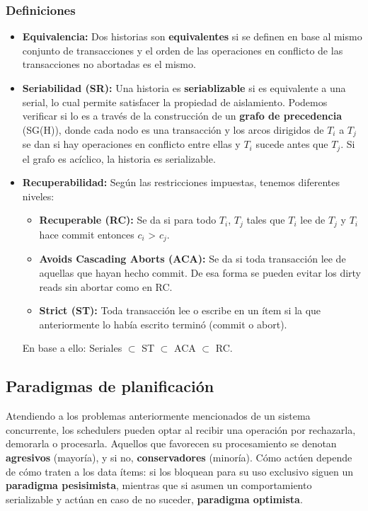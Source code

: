 \subsubsection*{Definiciones}
\begin{itemize}
    \item \textbf{Equivalencia:} Dos historias son \textbf{equivalentes} si se definen en base al mismo conjunto de transacciones y el orden de las operaciones en conflicto de las transacciones no abortadas es el mismo.
    \item \textbf{Seriabilidad (SR):} Una historia es \textbf{seriablizable} si es equivalente a una serial, lo cual permite satisfacer la propiedad de aislamiento. Podemos verificar si lo es a través de la construcción de un \textbf{grafo de precedencia} (SG(H)), donde cada nodo es una transacción y los arcos dirigidos de $T_i$ a $T_j$ se dan si hay operaciones en conflicto entre ellas y $T_i$ sucede antes que $T_j$. Si el grafo es acíclico, la historia es serializable.
    \item \textbf{Recuperabilidad:} Según las restricciones impuestas, tenemos diferentes niveles:
    \begin{itemize}
    \item \textbf{Recuperable (RC):} Se da si para todo $T_i$, $T_j$ tales que $T_i$ lee de $T_j$ y $T_i$ hace commit entonces $c_i$ > $c_j$.
    \item \textbf{Avoids Cascading Aborts (ACA):} Se da si toda transacción lee de aquellas que hayan hecho commit. De esa forma se pueden evitar los dirty reads sin abortar como en RC.
    \item \textbf{Strict (ST):} Toda transacción lee o escribe en un ítem si la que anteriormente lo había escrito terminó (commit o abort).
    \end{itemize}
    En base a ello: Seriales $\subset$ ST $\subset$ ACA $\subset$ RC.    
\end{itemize}

\subsection*{Paradigmas de planificación}
Atendiendo a los problemas anteriormente mencionados de un sistema concurrente, los schedulers pueden optar al recibir una operación por rechazarla, demorarla o procesarla. Aquellos que favorecen su procesamiento se denotan
 \textbf{agresivos} (mayoría), y si no, \textbf{conservadores} (minoría). Cómo actúen depende de cómo traten a los data ítems: si los bloquean para su uso exclusivo siguen un \textbf{paradigma pesisimista}, mientras que si asumen un comportamiento serializable y actúan en caso de no suceder, \textbf{paradigma optimista}.

